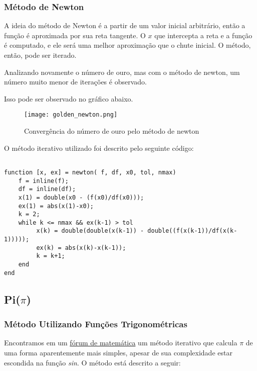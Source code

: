 \subsubsection{Método de Newton}

A ideia do método de Newton é a partir de um valor inicial arbitrário, então a
função é aproximada por sua reta tangente. O $x$ que intercepta a reta e a
função é computado, e ele será uma melhor aproximação que o chute inicial. O
método, então, pode ser iterado.

Analizando novamente o número de ouro, mas com o método de newton, um número
muito menor de iterações é observado.



Isso pode ser observado no gráfico abaixo.

\begin{figure}[H]
    \centering
    \texttt{[image: golden\_newton.png]}
    \caption{Convergência do número de ouro pelo método de newton}
    \label{golden_newton}
\end{figure}

O método iterativo utilizado foi descrito pelo seguinte código:

\begin{lstlisting}

function [x, ex] = newton( f, df, x0, tol, nmax)
	f = inline(f);
	df = inline(df);
	x(1) = double(x0 - (f(x0)/df(x0)));
	ex(1) = abs(x(1)-x0);
	k = 2;
	while k <= nmax && ex(k-1) > tol
		 x(k) = double(double(x(k-1)) - double((f(x(k-1))/df(x(k-1)))));
		 ex(k) = abs(x(k)-x(k-1));
		 k = k+1;
	end
end

\end{lstlisting}

\subsection{Pi($\pi$)}

\subsubsection{Método Utilizando Funções Trigonométricas}

Encontramos em um
\href{http://mathforum.org/library/drmath/view/65244.html}{fórum de matemática}
um método iterativo que calcula $ \pi $ de uma forma aparentemente mais simples,
apesar de sua complexidade estar escondida na função \emph{sin}. O método está
descrito a seguir:

